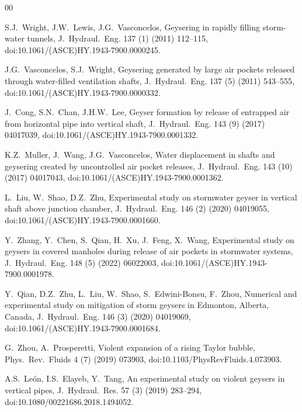 \documentclass[preprint,12pt]{elsarticle}
\begin{document}
\begin{thebibliography}{00}

S.J.~Wright, J.W.~Lewis, J.G.~Vasconcelos,
Geysering in rapidly filling storm-water tunnels,
J.~Hydraul.~Eng. 137 (1) (2011) 112--115,
doi:10.1061/(ASCE)HY.1943-7900.0000245.

J.G.~Vasconcelos, S.J.~Wright,
Geysering generated by large air pockets released through water-filled
ventilation shafts,
J.~Hydraul.~Eng. 137 (5) (2011) 543--555,
doi:10.1061/(ASCE)HY.1943-7900.0000332.

J.~Cong, S.N.~Chan, J.H.W.~Lee,
Geyser formation by release of entrapped air from horizontal pipe into
vertical shaft,
J.~Hydraul.~Eng. 143 (9) (2017) 04017039,
doi:10.1061/(ASCE)HY.1943-7900.0001332.

K.Z.~Muller, J.~Wang, J.G.~Vasconcelos,
Water displacement in shafts and geysering created by uncontrolled air
pocket releases,
J.~Hydraul.~Eng. 143 (10) (2017) 04017043,
doi:10.1061/(ASCE)HY.1943-7900.0001362.

L.~Liu, W.~Shao, D.Z.~Zhu,
Experimental study on stormwater geyser in vertical shaft above junction
chamber,
J.~Hydraul.~Eng. 146 (2) (2020) 04019055,
doi:10.1061/(ASCE)HY.1943-7900.0001660.

Y.~Zhang, Y.~Chen, S.~Qian, H.~Xu, J.~Feng, X.~Wang,
Experimental study on geysers in covered manholes during release of air
pockets in stormwater systems,
J.~Hydraul.~Eng. 148 (5) (2022) 06022003,
doi:10.1061/(ASCE)HY.1943-7900.0001978.

Y.~Qian, D.Z.~Zhu, L.~Liu, W.~Shao, S.~Edwini-Bonsu, F.~Zhou,
Numerical and experimental study on mitigation of storm geysers in
Edmonton, Alberta, Canada,
J.~Hydraul.~Eng. 146 (3) (2020) 04019069,
doi:10.1061/(ASCE)HY.1943-7900.0001684.

{\raggedright
G.~Zhou, A.~Prosperetti,
Violent expansion of a rising Taylor bubble,
Phys.~Rev.~Fluids 4 (7) (2019) 073903,
doi:10.1103/PhysRevFluids.4.073903.\par}

A.S.~Le\'{o}n, I.S.~Elayeb, Y.~Tang,
An experimental study on violent geysers in vertical pipes,
J.~Hydraul.~Res. 57 (3) (2019) 283--294,
doi:10.1080/00221686.2018.1494052.


\end{thebibliography}
\end{document}
